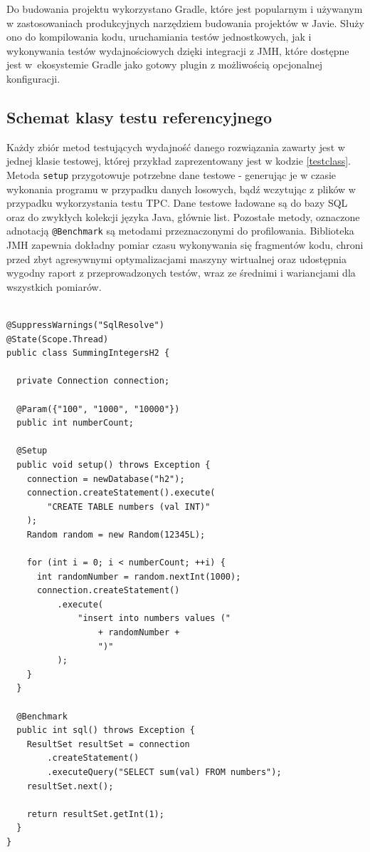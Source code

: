 \documentclass[12pt,twoside,openright]{extarticle}
\begin{document}
    Do budowania projektu wykorzystano Gradle, które jest popularnym i używanym w zastosowaniach produkcyjnych narzędziem budowania projektów w Javie. Służy ono do kompilowania kodu, uruchamiania testów jednostkowych, jak i wykonywania testów wydajnościowych dzięki integracji z JMH, które dostępne jest w~ekosystemie Gradle jako gotowy plugin z możliwością opcjonalnej konfiguracji.

\subsection{Schemat klasy testu referencyjnego}


    Każdy zbiór metod testujących wydajność danego rozwiązania zawarty jest w jednej klasie testowej, której przykład zaprezentowany jest w kodzie \ref{testclass}. Metoda \texttt{setup} przygotowuje potrzebne dane testowe - generując je w czasie wykonania programu w przypadku danych losowych, bądź wczytując z plików w przypadku wykorzystania testu TPC. Dane testowe ładowane są do bazy SQL oraz do zwykłych kolekcji języka Java, głównie list. Pozostałe metody, oznaczone adnotacją \texttt{@Benchmark} są metodami przeznaczonymi do profilowania. Biblioteka JMH zapewnia dokładny pomiar czasu wykonywania się fragmentów kodu, chroni przed zbyt agresywnymi optymalizacjami maszyny wirtualnej oraz udostępnia wygodny raport z przeprowadzonych testów, wraz ze średnimi i wariancjami dla wszystkich pomiarów.

\begin{lstlisting}[label=testclass, caption=Przykładowa klasa JMH]

@SuppressWarnings("SqlResolve")
@State(Scope.Thread)
public class SummingIntegersH2 {
  
  private Connection connection;
  
  @Param({"100", "1000", "10000"})
  public int numberCount;
  
  @Setup
  public void setup() throws Exception {
    connection = newDatabase("h2");
    connection.createStatement().execute(
        "CREATE TABLE numbers (val INT)"
    );
    Random random = new Random(12345L);
    
    for (int i = 0; i < numberCount; ++i) {
      int randomNumber = random.nextInt(1000);
      connection.createStatement()
          .execute(
              "insert into numbers values ("
                  + randomNumber +
                  ")"
          );
    }
  }
  
  @Benchmark
  public int sql() throws Exception {
    ResultSet resultSet = connection
        .createStatement()
        .executeQuery("SELECT sum(val) FROM numbers");
    resultSet.next();
    
    return resultSet.getInt(1);
  }
}


\end{lstlisting}
\end{document}
